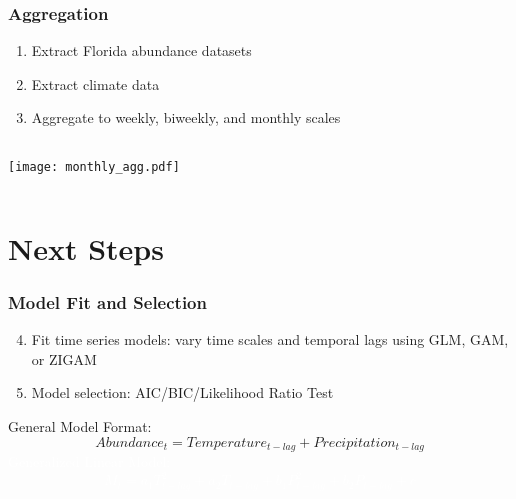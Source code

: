 \documentclass{beamer}
\begin{document}
\begin{frame}
\frametitle{Aggregation}

\begin{enumerate}
	\item Extract Florida abundance datasets 
	
	\item Extract climate data 
	
	\item Aggregate to weekly, biweekly, and monthly scales	
\end{enumerate}


\vspace{0.7cm}
\begin{columns}
	\begin{column}{0.7\textwidth}
		\texttt{[image: monthly\_agg.pdf]}
	\end{column}
	\begin{column}{0.3\textwidth}
		
	\end{column}
\end{columns}

\end{frame}

\section{Next Steps}

\begin{frame}
\frametitle{Model Fit and Selection}

\begin{enumerate}
	\setcounter{enumi}{3}
	\item Fit time series models: vary time scales and temporal lags using GLM, GAM, or ZIGAM
	
	\item Model selection: AIC/BIC/Likelihood Ratio Test
	
\end{enumerate}
\vspace{0.1cm}
\small
General Model Format:
$$ Abundance_t = Temperature_{t-lag} + Precipitation_{t-lag} $$
\textcolor{white}{
Generalized Linear Model:
$$ M_t = a_1T_{t-lag}^2 + a_2T_{t-lag} + b_1P_{t-lag}^2 + b_2P_{t-lag} + c$$
}
\end{frame}
\end{document}
